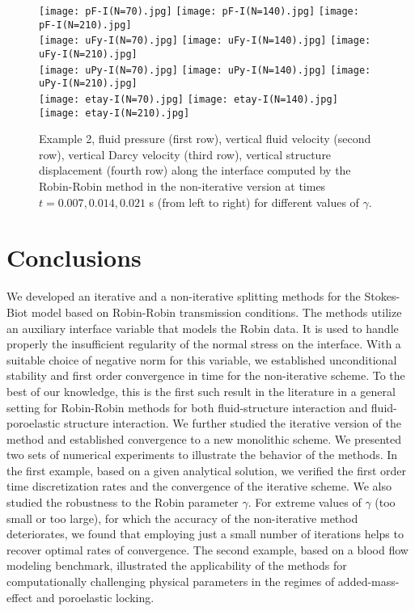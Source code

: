 \documentclass[11pt]{article}
\begin{document}
\begin{figure}[ht!]
\begin{center}
\texttt{[image: pF-I(N=70).jpg]}
\texttt{[image: pF-I(N=140).jpg]}
\texttt{[image: pF-I(N=210).jpg]}\\
\texttt{[image: uFy-I(N=70).jpg]}
\texttt{[image: uFy-I(N=140).jpg]}
\texttt{[image: uFy-I(N=210).jpg]}\\
\texttt{[image: uPy-I(N=70).jpg]}
\texttt{[image: uPy-I(N=140).jpg]}
\texttt{[image: uPy-I(N=210).jpg]}\\
\texttt{[image: etay-I(N=70).jpg]}
\texttt{[image: etay-I(N=140).jpg]}
\texttt{[image: etay-I(N=210).jpg]}
\end{center}
\caption{Example 2, fluid pressure (first row), vertical fluid velocity (second row),
vertical Darcy velocity (third row), vertical structure
displacement (fourth row) along the interface computed by the Robin-Robin method in the non-iterative version at times $t= 0.007, 0.014, 0.021$ s (from left to right) for different values of $\gamma$.}\label{matplots:pressure-velocity-disp-gamma}
\end{figure}

\section{Conclusions}\label{sec:concl}
We developed an iterative and a non-iterative splitting methods for the Stokes-Biot model based on Robin-Robin transmission conditions. The methods utilize an auxiliary interface variable that models the Robin data. It is used to handle properly the insufficient regularity of the normal stress on the interface. With a suitable choice of negative norm for this variable, we established unconditional stability and first order convergence in time for the non-iterative scheme. To the best of our knowledge, this is the first such result in the literature in a general setting for Robin-Robin methods for both fluid-structure interaction and fluid-poroelastic structure interaction. We further studied the iterative version of the method and established convergence to a new monolithic scheme. We presented two sets of numerical experiments to illustrate the behavior of the methods. In the first example, based on a given analytical solution, we verified the first order time discretization rates and the convergence of the iterative scheme. We also studied the robustness to the Robin parameter $\gamma$. For extreme values of $\gamma$ (too small or too large), for which the accuracy of the non-iterative method deteriorates, we found that employing just a small number of iterations helps to recover optimal rates of convergence. The second example, based on a blood flow modeling benchmark, illustrated the applicability of the methods for computationally challenging physical parameters in the regimes of added-mass-effect and poroelastic locking. 



\end{document}
